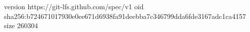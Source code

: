 version https://git-lfs.github.com/spec/v1
oid sha256:b724671017930e0ee671d6938fa91deebba7c346799dda6fde3167adc1ca4157
size 260304
